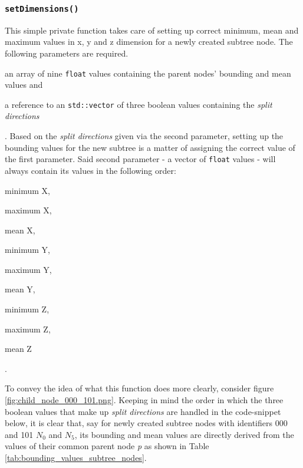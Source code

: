 	\subsubsection{\texttt{setDimensions()}}
	\label{sec:setDimensions}
This simple private function takes care of setting up correct minimum, mean and maximum values in x, y and z dimension for a newly created subtree node. The following parameters are required.
\begin{enumerate*}
	\item an array of nine \texttt{float} values containing the parent nodes' bounding and mean values and
	\item a reference to an \texttt{std::vector} of three boolean values containing the \textit{split directions}
\end{enumerate*}.
Based on the \textit{split directions} given via the second parameter, setting up the bounding values for the new subtree is a matter of assigning the correct value of the first parameter. Said second parameter - a vector of \texttt{float} values - will always contain its values in the following order:
\begin{enumerate*}
\addtocounter{enumi}{-1}
	\item minimum X,
	\item maximum X,
	\item mean X,
	\item minimum Y,
	\item maximum Y,
	\item mean Y,
	\item minimum Z,
	\item maximum Z,
	\item mean Z
\end{enumerate*}.

To convey the idea of what this function does more clearly, consider figure \ref{fig:child_node_000_101.png}. Keeping in mind the order in which the three boolean values that make up \textit{split directions} are handled in the code-snippet below, it is clear that, say for newly created subtree nodes with identifiers 000 and 101 \textit{$N_0$} and \textit{$N_5$}, its bounding and mean values are directly derived from the values of their common parent node \textit{p} as shown in Table \ref{tab:bounding_values_subtree_nodes}.

